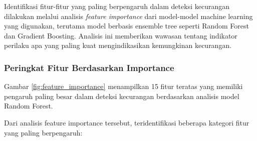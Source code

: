 Identifikasi fitur-fitur yang paling berpengaruh dalam deteksi kecurangan dilakukan melalui analisis \textit{feature importance} dari model-model machine learning yang digunakan, terutama model berbasis ensemble tree seperti Random Forest dan Gradient Boosting. Analisis ini memberikan wawasan tentang indikator perilaku apa yang paling kuat mengindikasikan kemungkinan kecurangan.

\subsubsection{Peringkat Fitur Berdasarkan Importance}

Gambar \ref{fig:feature_importance} menampilkan 15 fitur teratas yang memiliki pengaruh paling besar dalam deteksi kecurangan berdasarkan analisis model Random Forest.


Dari analisis feature importance tersebut, teridentifikasi beberapa kategori fitur yang paling berpengaruh:

